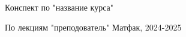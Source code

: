 \begin{titlepage}
    \begin{center}
        \LARGE
        Конспект по "название курса"

        \large 
        По лекциям "преподователь"
        \vfill
        \normalsize
        Матфак, 2024-2025
    \end{center}
\end{titlepage}
